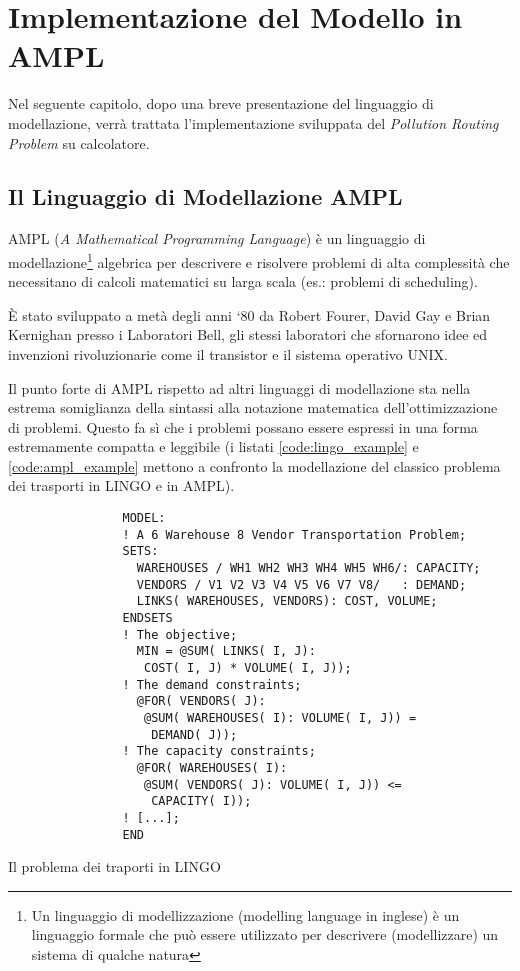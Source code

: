 \chapter{Implementazione del Modello in AMPL}\label{ch:ampl}
	Nel seguente capitolo, dopo una breve presentazione del linguaggio di modellazione, verrà trattata l’implementazione sviluppata del \emph{Pollution Routing Problem} su calcolatore.

	\section{Il Linguaggio di Modellazione AMPL} %
	\label{sec:il_linguaggio_di_modellazione_ampl}
		AMPL (\emph{A Mathematical Programming Language}) è un linguaggio di modellazione\footnote{Un linguaggio di modellizzazione (modelling language in inglese) è un linguaggio formale che può essere utilizzato per descrivere (modellizzare) un sistema di qualche natura} algebrica	per descrivere e risolvere problemi di alta complessità che necessitano di calcoli matematici su larga scala (es.: problemi di  scheduling). 
		
		È stato sviluppato a metà degli anni ‘80 da Robert Fourer, David Gay e Brian Kernighan presso i Laboratori Bell, gli stessi laboratori che sfornarono idee ed invenzioni rivoluzionarie come il transistor e il sistema operativo UNIX.

		Il punto forte di AMPL rispetto ad altri linguaggi di modellazione sta nella estrema somiglianza della sintassi alla notazione matematica dell’ottimizzazione di problemi. 
		Questo fa sì che i problemi possano essere espressi in una forma estremamente compatta e leggibile (i listati \ref{code:lingo_example} e \ref{code:ampl_example} mettono a confronto la modellazione del classico problema dei trasporti in LINGO e in AMPL).

		\begin{listing}[H]
			\begin{verbatim}
				MODEL:
				! A 6 Warehouse 8 Vendor Transportation Problem;
				SETS:
				  WAREHOUSES / WH1 WH2 WH3 WH4 WH5 WH6/: CAPACITY;
				  VENDORS / V1 V2 V3 V4 V5 V6 V7 V8/   : DEMAND;
				  LINKS( WAREHOUSES, VENDORS): COST, VOLUME;
				ENDSETS
				! The objective;
				  MIN = @SUM( LINKS( I, J):
				   COST( I, J) * VOLUME( I, J));
				! The demand constraints;
				  @FOR( VENDORS( J):
				   @SUM( WAREHOUSES( I): VOLUME( I, J)) =
				    DEMAND( J));
				! The capacity constraints;
				  @FOR( WAREHOUSES( I):
				   @SUM( VENDORS( J): VOLUME( I, J)) <=
				    CAPACITY( I));
				! [...];
				END
			\end{verbatim}
			\caption{Il problema dei traporti in LINGO}
			\label{code:lingo_example}
		\end{listing}

